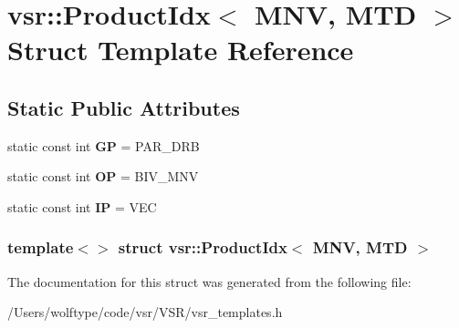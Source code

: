 \hypertarget{structvsr_1_1_product_idx_3_01_m_n_v_00_01_m_t_d_01_4}{\section{vsr\-:\-:Product\-Idx$<$ M\-N\-V, M\-T\-D $>$ Struct Template Reference}
\label{structvsr_1_1_product_idx_3_01_m_n_v_00_01_m_t_d_01_4}
}
\subsection*{Static Public Attributes}
\begin{DoxyCompactItemize}
\item 
\hypertarget{structvsr_1_1_product_idx_3_01_m_n_v_00_01_m_t_d_01_4_a67a141dba7539e584f4275e27420e4f6}{static const int {\bfseries G\-P} = P\-A\-R\-\_\-\-D\-R\-B}\label{structvsr_1_1_product_idx_3_01_m_n_v_00_01_m_t_d_01_4_a67a141dba7539e584f4275e27420e4f6}

\item 
\hypertarget{structvsr_1_1_product_idx_3_01_m_n_v_00_01_m_t_d_01_4_a4d0bcfd2d057e0b55a6cf2396800470b}{static const int {\bfseries O\-P} = B\-I\-V\-\_\-\-M\-N\-V}\label{structvsr_1_1_product_idx_3_01_m_n_v_00_01_m_t_d_01_4_a4d0bcfd2d057e0b55a6cf2396800470b}

\item 
\hypertarget{structvsr_1_1_product_idx_3_01_m_n_v_00_01_m_t_d_01_4_a8a5826459de76b689cd79076ff8abf62}{static const int {\bfseries I\-P} = V\-E\-C}\label{structvsr_1_1_product_idx_3_01_m_n_v_00_01_m_t_d_01_4_a8a5826459de76b689cd79076ff8abf62}

\end{DoxyCompactItemize}
\subsubsection*{template$<$$>$ struct vsr\-::\-Product\-Idx$<$ M\-N\-V, M\-T\-D $>$}



The documentation for this struct was generated from the following file\-:\begin{DoxyCompactItemize}
\item 
/\-Users/wolftype/code/vsr/\-V\-S\-R/vsr\-\_\-templates.\-h\end{DoxyCompactItemize}
